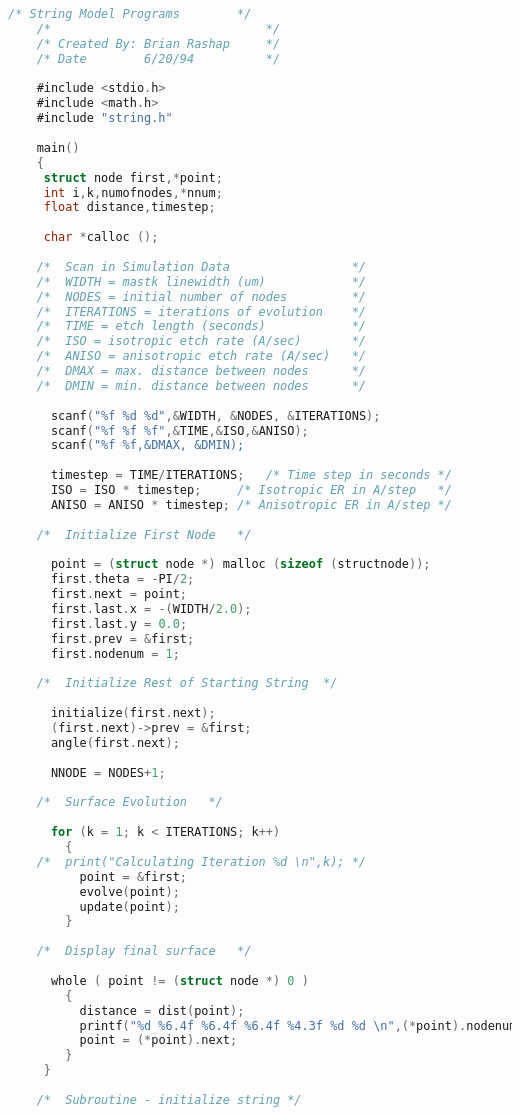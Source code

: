\begin{lstlisting}[language=C]
	/* String Model Programs		*/
	/*								*/
	/* Created By: Brian Rashap		*/
	/* Date		   6/20/94			*/
	
	#include <stdio.h>
	#include <math.h>
	#include "string.h"
	
	main()
	{
	 struct node first,*point;
	 int i,k,numofnodes,*nnum;
	 float distance,timestep;
		
	 char *calloc ();
		
	/*	Scan in Simulation Data 				*/
	/*	WIDTH = mastk linewidth (um)			*/
	/*	NODES = initial number of nodes			*/
	/*	ITERATIONS = iterations of evolution	*/
	/*	TIME = etch length (seconds)			*/
	/*	ISO = isotropic etch rate (A/sec)		*/
	/*	ANISO = anisotropic etch rate (A/sec)	*/
	/*	DMAX = max. distance between nodes		*/
	/*	DMIN = min. distance between nodes		*/
		
	  scanf("%f %d %d",&WIDTH, &NODES, &ITERATIONS);
	  scanf("%f %f %f",&TIME,&ISO,&ANISO);
	  scanf("%f %f,&DMAX, &DMIN);
			
	  timestep = TIME/ITERATIONS;	/* Time step in seconds	*/
	  ISO = ISO * timestep;		/* Isotropic ER in A/step	*/
	  ANISO = ANISO * timestep; /* Anisotropic ER in A/step */
	
	/*	Initialize First Node	*/
	
	  point = (struct node *) malloc (sizeof (structnode));
	  first.theta = -PI/2;
	  first.next = point;
	  first.last.x = -(WIDTH/2.0);
	  first.last.y = 0.0;
	  first.prev = &first;
	  first.nodenum = 1;
	  
	/*	Initialize Rest of Starting String	*/
	  
	  initialize(first.next);
	  (first.next)->prev = &first;
	  angle(first.next);
	  
	  NNODE = NODES+1;
	  
	/*	Surface Evolution	*/
	
	  for (k = 1; k < ITERATIONS; k++)
	  	{
	/*	print("Calculating Iteration %d \n",k);	*/
		  point = &first;
	  	  evolve(point);
	  	  update(point);
  	  	}
    	
    /*	Display final surface	*/
    
      whole ( point != (struct node *) 0 )
      	{
      	  distance = dist(point);
      	  printf("%d %6.4f %6.4f %6.4f %4.3f %d %d \n",(*point).nodenum, (*point).last.x, (*point).last.y, (*point).theta,distance,leftbound(point),rightbound(point));
      	  point = (*point).next;
      	}
	 }
 
 	/*	Subroutine - initialize string */
 	

\end{lstlisting}
